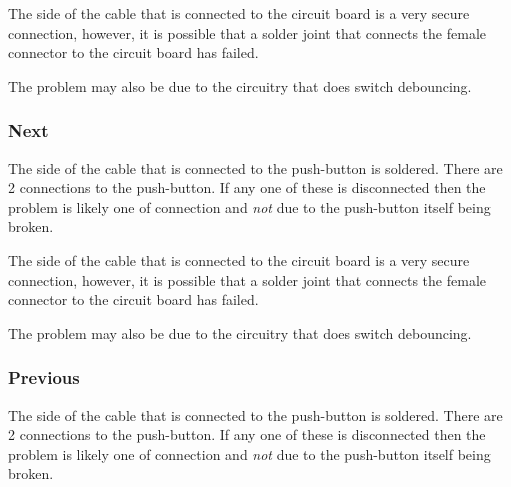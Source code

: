 \par\medskip

The side of the cable that is connected to the circuit board is a very secure
connection, however, it is possible that a solder joint that connects the
female connector to the circuit board has failed.

\par\medskip

The problem may also be due to the circuitry that does switch debouncing.

\subsubsection{Next}

 

\par\bigskip

The side of the cable that is connected to the  push-button is soldered.
There are \num{2} connections to the  push-button.  If any one of these
is disconnected then the problem is likely one of connection and \textit{not}
due to the  push-button itself being broken.

\par\medskip

The side of the cable that is connected to the circuit board is a very secure
connection, however, it is possible that a solder joint that connects the
female connector to the circuit board has failed.

\par\medskip

The problem may also be due to the circuitry that does switch debouncing.

\subsubsection{Previous}

 

\par\bigskip

The side of the cable that is connected to the  push-button is soldered.
There are \num{2} connections to the  push-button.  If any one of these
is disconnected then the problem is likely one of connection and \textit{not}
due to the  push-button itself being broken.

